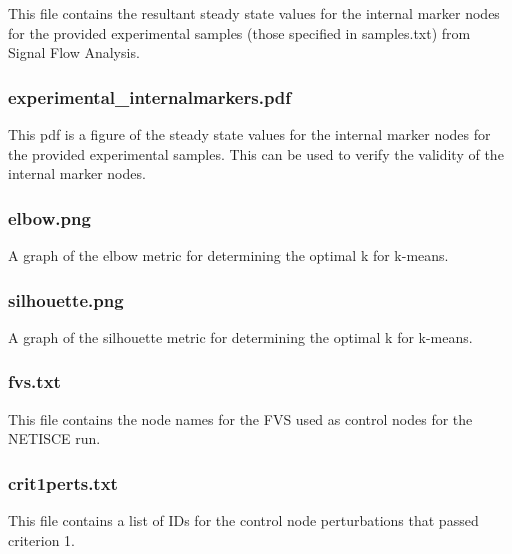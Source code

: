 \documentclass[
]{book}
\begin{document}
This file contains the resultant steady state values for the internal marker nodes for the provided experimental samples (those specified in samples.txt) from Signal Flow Analysis.

\hypertarget{section-id}{%
\subsubsection*{experimental\_internalmarkers.pdf}\label{section-id}}

This pdf is a figure of the steady state values for the internal marker nodes for the provided experimental samples. This can be used to verify the validity of the internal marker nodes.

\hypertarget{section-id}{%
\subsubsection*{elbow.png}\label{section-id}}

A graph of the elbow metric for determining the optimal k for k-means.

\hypertarget{section-id}{%
\subsubsection*{silhouette.png}\label{section-id}}

A graph of the silhouette metric for determining the optimal k for k-means.

\hypertarget{section-id}{%
\subsubsection*{fvs.txt}\label{section-id}}

This file contains the node names for the FVS used as control nodes for the NETISCE run.

\hypertarget{section-id}{%
\subsubsection*{crit1perts.txt}\label{section-id}}

This file contains a list of IDs for the control node perturbations that passed criterion 1.
\end{document}
